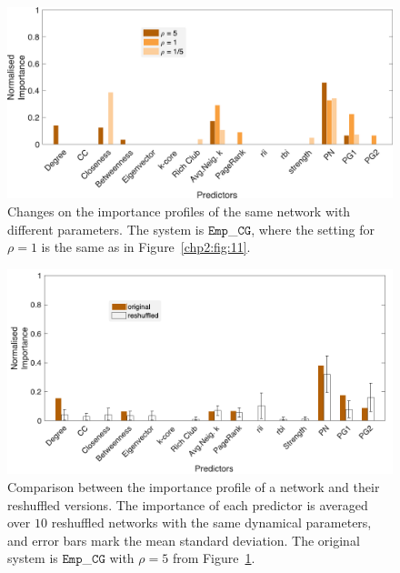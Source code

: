 \begin{figure}[t]
    \centering
    \includegraphics[width=1.05\textwidth]{figures/chp2/fig_12.pdf}
    \caption[Impact of the interaction strengths' ratio on the importance profile]{Changes on the importance profiles of the same network with different parameters. The system is $\texttt{Emp}$\_$\texttt{CG}$, where the setting for $\rho= 1$ is the same as in Figure~\ref{chp2:fig:11}. }
    \label{chp2:fig:12}
\end{figure}

 \begin{figure}[t]
    \centering
    \includegraphics[width=1.05\textwidth]{figures/chp2/fig_13.pdf}
    \caption[Impact of reshuffling on the importance profile]{ Comparison between the importance profile of a network and their reshuffled versions. The importance of each predictor is averaged over $10$ reshuffled networks with the same dynamical parameters, and error bars mark the mean standard deviation. The original system is $\texttt{Emp}$\_$\texttt{CG}$ with $\rho = 5$ from Figure~\ref{chp2:fig:12}. }
    \label{chp2:fig:13}
\end{figure}

